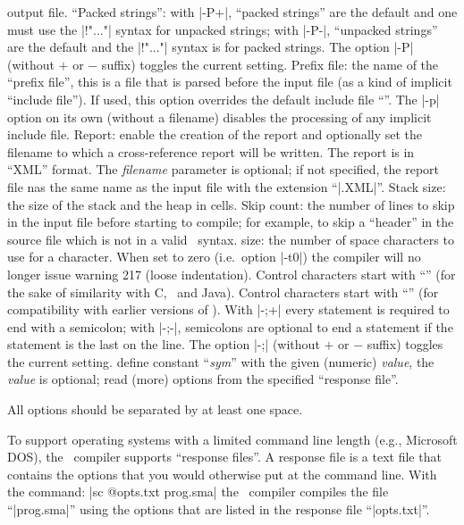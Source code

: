   output file.
  ``Packed strings'': with |-P+|, ``packed strings'' are the default and one
  must use the |!"..."| syntax for unpacked strings; with |-P-|, ``unpacked strings''
  are the default and the |!"..."| syntax is for packed strings. The option
  |-P| (without $+$ or $-$ suffix) toggles the current setting.
 
  Prefix file: the name of the ``prefix file'', this is
  a file that is parsed before the input file (as a kind of implicit ``include file'').
  If used, this option overrides the default include file ``''.
  The |-p| option on its own (without a filename) disables the processing of any
  implicit include file.
 Report: enable the creation of the report and optionally
  set the filename to which a cross-reference report will be written.
   The report is in ``XML'' format. The {\it filename\/} parameter is
  optional; if not specified, the report file nas the same name as the input file
  with the extension ``|.XML|''.
 Stack size: the size of the stack and the heap in cells.
 Skip count: the number of lines to skip in the input
  file before starting to compile; for example, to skip a ``header'' in the
  source file which is not in a valid \Small\ syntax.
  size: the number of space characters
  to use for a  character. When set to zero (i.e.\ option |-t0|)
  the compiler will no longer issue warning 217 (loose indentation).
\list{\tt -$\backslash$} Control characters start with ``\BS'' (for the sake of
  similarity with C, \Cpp\ and Java).
 Control characters start with ``'' (for compatibility
  with earlier versions of \Small).
\list{\tt -;\it +/-} With |-;+| every statement is required to end with a semicolon;
  with |-;-|, semicolons are optional to end a statement if the statement is the
  last on the line. The option |-;| (without $+$ or $-$ suffix) toggles the
  current setting.
 define constant ``{\it sym}'' with the given
  (numeric) {\it value}, the {\it value\/} is optional;
 read (more) options from the specified ``response
  file''.
\endlist
\goodbreak

All options should be separated by at least one space.

To support operating systems with a limited command line length (e.g., Microsoft DOS),
the \Small\ compiler supports ``response files''. A response file is a text file
that contains the options that you would otherwise put at the command line. With
the command:
\tabto 35pt |sc @opts.txt prog.sma| \lbreak
the \Small\ compiler compiles the file ``|prog.sma|'' using the options that are
listed in the response file ``|opts.txt|''.



